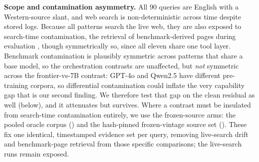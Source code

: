 \documentclass[11pt]{article}
\begin{document}
\textbf{Scope and contamination asymmetry.} All $90$ queries are English with a
Western-source slant, and web search is non-deterministic across time despite stored
logs. Because all patterns search the live web, they are also exposed to search-time
contamination, the retrieval of benchmark-derived pages during evaluation
\citep{searchtimecontam2026}, though symmetrically so, since all eleven share one tool
layer. Benchmark contamination is plausibly symmetric across patterns that share a base
model, so the orchestration contrasts are unaffected, but \emph{not} symmetric across
the frontier-vs-7B contrast: GPT-4o and Qwen2.5
have different pre-training corpora, so differential contamination could inflate the
very capability gap that is our second finding. We therefore test that gap on the clean
residual as well (below), and it attenuates but survives. Where a contrast must be insulated from
search-time contamination entirely, we use the frozen-source arms: the pooled oracle corpus
() and the hash-pinned frozen-vintage source set (). These fix
one identical, timestamped evidence set per query, removing live-search drift and
benchmark-page retrieval from those specific comparisons; the live-search runs remain exposed.
\end{document}
